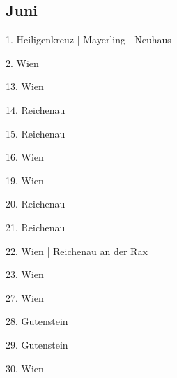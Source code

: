 \documentclass[twoside=false,titlepage=false,open=any, parskip=never, fontsize=10pt, headings=small, chapterprefix=false, appendixprefix=false, DIV=15]{scrbook}
\begin{document}
\begin{multicols}{3}
            \section*{Juni}
            1. Heiligenkreuz | Mayerling | Neuhaus\par
            2. Wien\par
            13. Wien\par
            14. Reichenau\par
            15. Reichenau\par
            16. Wien\par
            19. Wien\par
            20. Reichenau\par
            21. Reichenau\par
            22. Wien | Reichenau an der Rax\par
            23. Wien\par
            27. Wien\par
            28. Gutenstein\par
            29. Gutenstein\par
            30. Wien\par

\end{multicols}
\end{document}
